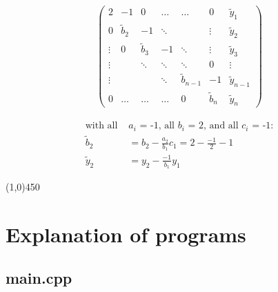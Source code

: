 \documentclass[11pt,a4paper,notitlepage]{article}
\begin{document}
\begin{minipage}{0.5\linewidth}
\begin{align*}
\left(\begin{matrix}
  2     & -1          & 0           & \dots   & \dots          & 0           &\tilde{y}_1    \\
  0     & \tilde{b}_2 & -1          & \ddots  &                & \vdots      &\tilde{y}_2    \\
 \vdots & 0           & \tilde{b}_3 & -1      & \ddots         & \vdots      &\tilde{y}_3    \\
 \vdots &             & \ddots      & \ddots  & \ddots         & 0           &\vdots         \\
 \vdots &             &             & \ddots  & \tilde{b}_{n-1}& -1       &\tilde{y}_{n-1}\\
  0     & \dots       & \dots       & \dots   & 0              & \tilde{b}_n &\tilde{y}_n
\end{matrix}\right)
\end{align*}
\end{minipage}
\begin{minipage}{0.5\linewidth}
	\begin{align*}
	\text{with all } &\text{$a_i$ = -1, all $b_i$ = 2, and all $c_i$ = -1:}\\
	\tilde{b}_2 &= b_2 - \frac{a_2}{b_1} c_1  = 2 - \frac{-1}{2} -1\\
	\tilde{y}_2 &= y_2 - \frac{-1}{b_1} y_1
	\end{align*}
\end{minipage}

\begin{center}
\line(1,0){450}
\end{center}

\section{Explanation of programs}
\subsection{main.cpp}
\end{document}
